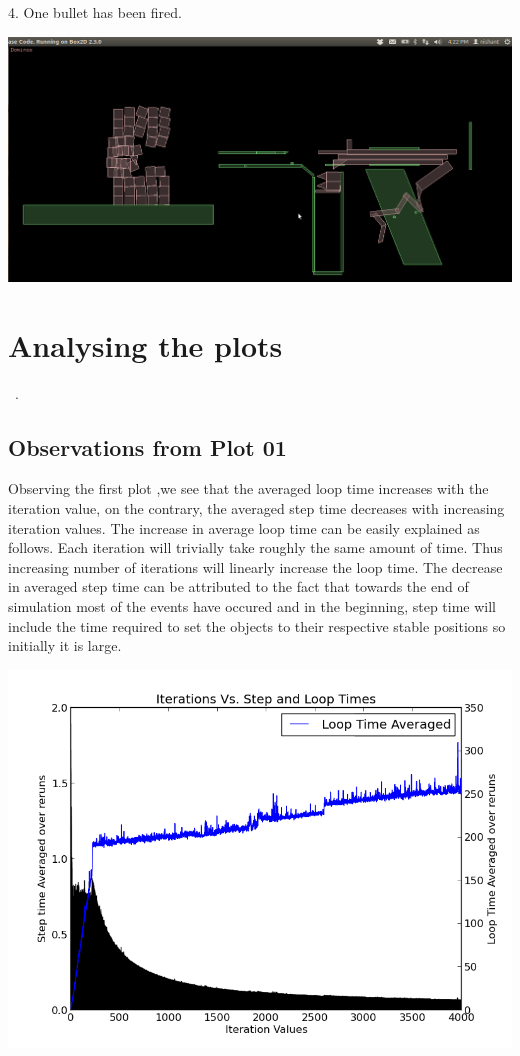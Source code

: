 \documentclass [11pt]{report}
\begin{document}
4. One bullet has been fired.\newline
\begin{center}
\includegraphics[scale=0.3]{./images/fired.png}\\

\end{center}
\section{Analysing the plots}
~\cite{mplib}.
\subsection{Observations from Plot 01}
Observing the first plot ,we see that the averaged loop time increases with the iteration value, on the contrary, the averaged step time decreases with increasing iteration values. The increase in average loop time can be easily explained as follows. Each iteration will trivially take roughly the same amount of time. Thus increasing number of iterations will linearly increase the loop time. The decrease in averaged step time can be attributed to the fact that towards the end of simulation most of the events have occured and in the beginning, step time will include the time required to set the objects to their respective stable positions so initially it is large.
\begin{center}
\includegraphics[scale=0.7]{./images/plot01.png}
\end{center}
\end{document}
